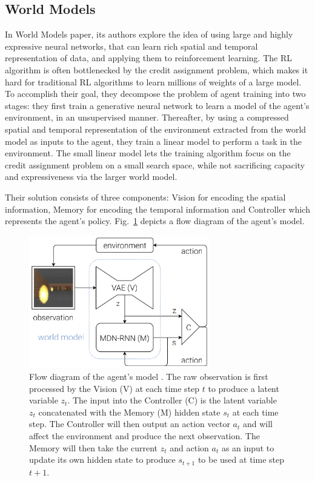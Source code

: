 \subsection{World Models}

In World Models \cite{Algo.WorldModels} paper, its authors explore the idea of using large and highly expressive neural networks, that can learn rich spatial and temporal representation of data, and applying them to reinforcement learning. The RL algorithm is often bottlenecked by the credit assignment problem, which makes it hard for traditional RL algorithms to learn millions of weights of a large model. To accomplish their goal, they decompose the problem of agent training into two stages: they first train a generative neural network to learn a model of the agent's environment, in an unsupervised manner. Thereafter, by using a compressed spatial and temporal representation of the environment extracted from the world model as inputs to the agent, they train a linear model to perform a task in the environment. The small linear model lets the training algorithm focus on the credit assignment problem on a small search space, while not sacrificing capacity and expressiveness via the larger world model.

Their solution consists of three components: Vision for encoding the spatial information, Memory for encoding the temporal information and Controller which represents the agent's policy. Fig.~\ref{Fig.WorldModels} depicts a flow diagram of the agent's model.

\begin{figure}[H]
\includegraphics[width=0.7\textwidth,keepaspectratio]{figures/WorldModels.png}
\caption[Flow diagram of the World Models agent's model]{Flow diagram of the agent's model \protect\cite{Algo.WorldModels}. The raw observation is first processed by the Vision (V) at each time step $t$ to produce a latent variable $z_t$. The input into the Controller (C) is the latent variable $z_t$ concatenated with the Memory (M) hidden state $s_t$ at each time step. The Controller will then output an action vector $a_t$ and will affect the environment and produce the next observation. The Memory will then take the current $z_t$ and action $a_t$ as an input to update its own hidden state to produce $s_{t+1}$ to be used at time step $t + 1$.}
\label{Fig.WorldModels}
\end{figure}

